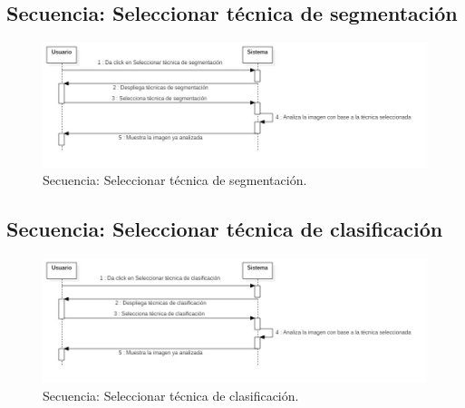 \documentclass[12pt]{report}
\begin{document}
\subsection{Secuencia: Seleccionar técnica de segmentación}
\begin{figure}[H]
\centering
\includegraphics[width = 12 cm, height = 7 cm]{segmentacion}
\caption{Secuencia: Seleccionar técnica de segmentación.}
\end{figure}

\subsection{Secuencia: Seleccionar técnica de clasificación}
\begin{figure}[H]
\centering
\includegraphics[width = 12 cm, height = 7 cm]{clasificacion}
\caption{Secuencia: Seleccionar técnica de clasificación.}
\end{figure}
\end{document}
